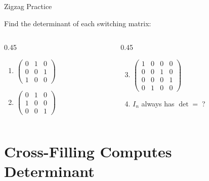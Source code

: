 \documentclass[10pt]{beamer}
\theoremstyle{definition}
\begin{document}
\begin{frame}{Zigzag Practice}

Find the determinant of each switching matrix:

\vfill

\begin{columns}[T]
\begin{column}{0.45\textwidth}
\begin{enumerate}
\item $\begin{pmatrix} 0 & 1 & 0 \\ 0 & 0 & 1 \\ 1 & 0 & 0 \end{pmatrix}$

\vfill

\item $\begin{pmatrix} 0 & 1 & 0 \\ 1 & 0 & 0 \\ 0 & 0 & 1 \end{pmatrix}$
\end{enumerate}
\end{column}
\begin{column}{0.45\textwidth}
\begin{enumerate}
\setcounter{enumi}{2}
\item $\begin{pmatrix} 1 & 0 & 0 & 0 \\ 0 & 0 & 1 & 0 \\ 0 & 0 & 0 & 1 \\ 0 & 1 & 0 & 0 \end{pmatrix}$

\vfill

\item $I_n$ always has $\det = \;$?
\end{enumerate}
\end{column}
\end{columns}

\vfill

\end{frame}


\section{Cross-Filling Computes Determinant}
\end{document}
